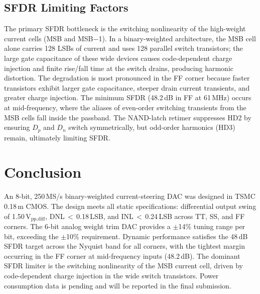 \documentclass[lettersize,journal]{IEEEtran}
\begin{document}
\subsection{SFDR Limiting Factors}

The primary SFDR bottleneck is the switching nonlinearity of the high-weight
current cells (MSB and MSB$-$1).
In a binary-weighted architecture, the MSB cell alone carries 128 LSBs of current
and uses 128 parallel switch transistors; the large gate capacitance of these
wide devices causes code-dependent charge injection and finite rise/fall time
at the switch drains, producing harmonic distortion.
The degradation is most pronounced in the FF corner because faster transistors
exhibit larger gate capacitance, steeper drain current transients, and greater
charge injection.
The minimum SFDR (48.2\,dB in FF at 61\,MHz) occurs at mid-frequency, where
the aliases of even-order switching transients from the MSB cells fall inside
the passband.
The NAND-latch retimer suppresses HD2 by ensuring $D_p$ and $D_n$ switch
symmetrically, but odd-order harmonics (HD3) remain, ultimately limiting SFDR.

\section{Conclusion}
\label{sec:conc}

An 8-bit, 250\,MS/s binary-weighted current-steering DAC was designed in TSMC
0.18\,\textmu m CMOS.
The design meets all static specifications: differential output swing of
1.50\,V$_{\text{pp,diff}}$, DNL\,$<$\,0.18\,LSB, and INL\,$<$\,0.24\,LSB
across TT, SS, and FF corners.
The 6-bit analog weight trim DAC provides a $\pm$14\% tuning range per bit,
exceeding the $\pm$10\% requirement.
Dynamic performance satisfies the 48\,dB SFDR target across the Nyquist band
for all corners, with the tightest margin occurring in the FF corner at
mid-frequency inputs (48.2\,dB).
The dominant SFDR limiter is the switching nonlinearity of the MSB current cell,
driven by code-dependent charge injection in the wide switch transistors.
Power consumption data is pending and will be reported in the final submission.

\end{document}
